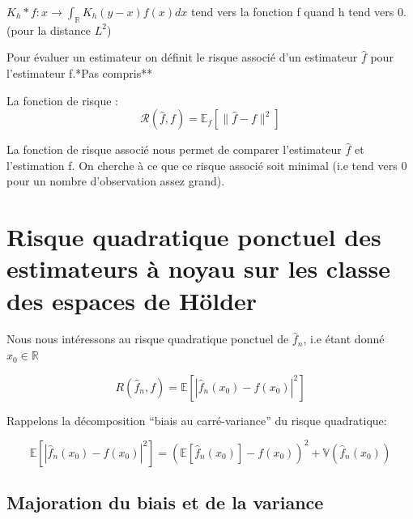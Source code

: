 \documentclass[
]{book}
\begin{document}
\begin{corol}
$K_h * f : x \rightarrow \int_{\mathbb R} K_h(y-x) f(x) dx$ tend vers la fonction f quand h tend vers 0.(pour la distance $L^2$)
\end{corol}

Pour évaluer un estimateur on définit le risque associé d'un estimateur \(\hat f\) pour l'estimateur f.\newline **Pas compris**

\begin{dfn} 
La fonction de risque : 
$$ 
\mathcal R(\hat f ,f)=\mathbb E_f[\parallel\hat f -f\parallel^2]
$$
\end{dfn}

\begin{rem}
  La fonction de risque associé nous permet de comparer l'estimateur $\hat f$ et l'estimation f.\newline
On cherche à ce que ce risque associé soit minimal (i.e tend vers 0 pour un nombre d'observation assez grand).\newline
\end{rem}

\hypertarget{risque-quadratique-ponctuel-des-estimateurs-uxe0-noyau-sur-les-classe-des-espaces-de-huxf6lder}{%
\section{Risque quadratique ponctuel des estimateurs à noyau sur les classe des espaces de Hölder}\label{risque-quadratique-ponctuel-des-estimateurs-uxe0-noyau-sur-les-classe-des-espaces-de-huxf6lder}}

Nous nous intéressons au risque quadratique ponctuel de \(\hat{f}_n\), i.e étant donné\newline
\(x_0 \in \mathbb{R}\)

\[
R(\hat {f}_n, f) = \mathbb{E}[|\hat {f}_n(x_0) - f(x_0)|^2]
\]

Rappelons la décomposition ``biais au carré-variance'' du risque quadratique:

\[
  \mathbb{E}[|\hat {f}_n(x_0) - f(x_0)|^2] = (\mathbb{E}[\hat {f}_n(x_0)] - f(x_0))^2 + \mathbb{V}(\hat {f}_n(x_0))
\]

\hypertarget{majoration-du-biais-et-de-la-variance}{%
\subsection{Majoration du biais et de la variance}\label{majoration-du-biais-et-de-la-variance}}
\end{document}
